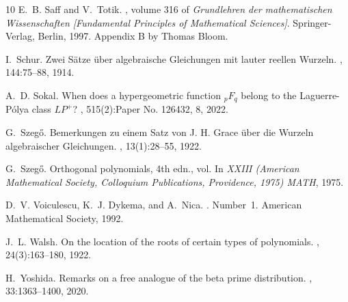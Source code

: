\documentclass[reqno,11pt]{amsart}
\theoremstyle{remark}
\begin{document}
\begin{thebibliography}{10}
	E.~B. Saff and V.~Totik.
	, volume 316 of {\em Grundlehren der mathematischen Wissenschaften [Fundamental Principles of Mathematical Sciences]}.
	\newblock Springer-Verlag, Berlin, 1997.
	\newblock Appendix B by Thomas Bloom.
	
	I.~Schur.
	\newblock Zwei {S}\"{a}tze \"{u}ber algebraische {G}leichungen mit lauter reellen {W}urzeln.
	, 144:75--88, 1914.
	
	A.~D. Sokal.
	\newblock When does a hypergeometric function {$_pF_q$} belong to the {L}aguerre-{P}\'{o}lya class {$LP^+$}?
	, 515(2):Paper No. 126432, 8, 2022.
	
	G.~Szeg\H{o}.
	\newblock Bemerkungen zu einem {Satz} von {J. H. Grace} \"uber die {Wurzeln} algebraischer {Gleichungen}.
	, 13(1):28--55, 1922.
	
	G.~Szeg\H{o}.
	\newblock Orthogonal polynomials, 4th edn., vol.
	\newblock In {\em XXIII (American Mathematical Society, Colloquium Publications, Providence, 1975) MATH}, 1975.
	
	D.~V. Voiculescu, K.~J. Dykema, and A.~Nica.
	.
	\newblock Number~1. American Mathematical Society, 1992.
	
	J.~L. Walsh.
	\newblock On the location of the roots of certain types of polynomials.
	, 24(3):163--180, 1922.
	
	H.~Yoshida.
	\newblock Remarks on a free analogue of the beta prime distribution.
	, 33:1363--1400, 2020.
	
\end{thebibliography}


 
 
\end{document}

